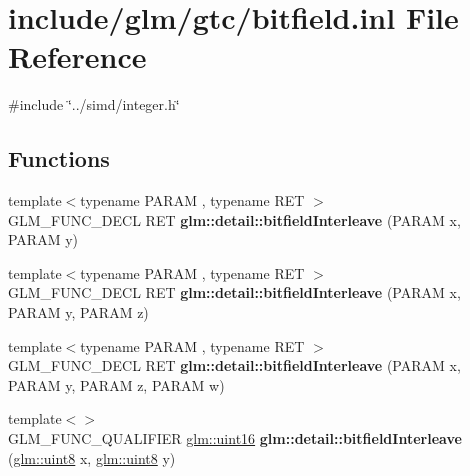\hypertarget{bitfield_8inl}{}\section{include/glm/gtc/bitfield.inl File Reference}
\label{bitfield_8inl}
{\ttfamily \#include \char`\"{}../simd/integer.\+h\char`\"{}}\newline
\subsection*{Functions}
\begin{DoxyCompactItemize}
\item 
\mbox{\label{bitfield_8inl_a39644ee418ae41e3393d1cb6191e32a7}} 
{\footnotesize template$<$typename P\+A\+R\+AM , typename R\+ET $>$ }\\G\+L\+M\+\_\+\+F\+U\+N\+C\+\_\+\+D\+E\+CL R\+ET {\bfseries glm\+::detail\+::bitfield\+Interleave} (P\+A\+R\+AM x, P\+A\+R\+AM y)
\item 
\mbox{\label{bitfield_8inl_aa2fdd8f720417a13990873ba704a3426}} 
{\footnotesize template$<$typename P\+A\+R\+AM , typename R\+ET $>$ }\\G\+L\+M\+\_\+\+F\+U\+N\+C\+\_\+\+D\+E\+CL R\+ET {\bfseries glm\+::detail\+::bitfield\+Interleave} (P\+A\+R\+AM x, P\+A\+R\+AM y, P\+A\+R\+AM z)
\item 
\mbox{\label{bitfield_8inl_a606f6dc8c8314159fafef68f820c2c65}} 
{\footnotesize template$<$typename P\+A\+R\+AM , typename R\+ET $>$ }\\G\+L\+M\+\_\+\+F\+U\+N\+C\+\_\+\+D\+E\+CL R\+ET {\bfseries glm\+::detail\+::bitfield\+Interleave} (P\+A\+R\+AM x, P\+A\+R\+AM y, P\+A\+R\+AM z, P\+A\+R\+AM w)
\item 
\mbox{\label{bitfield_8inl_ac59c574dc7900d87786f5a96f82ea6e7}} 
{\footnotesize template$<$$>$ }\\G\+L\+M\+\_\+\+F\+U\+N\+C\+\_\+\+Q\+U\+A\+L\+I\+F\+I\+ER \hyperlink{group__gtc__type__precision_gad8c2939e1fdd8e5828b31d95c52255d5}{glm\+::uint16} {\bfseries glm\+::detail\+::bitfield\+Interleave} (\hyperlink{group__gtc__type__precision_ga1a7dcd8aac97cc8020817c94049deff2}{glm\+::uint8} x, \hyperlink{group__gtc__type__precision_ga1a7dcd8aac97cc8020817c94049deff2}{glm\+::uint8} y)

\end{DoxyCompactItemize}
